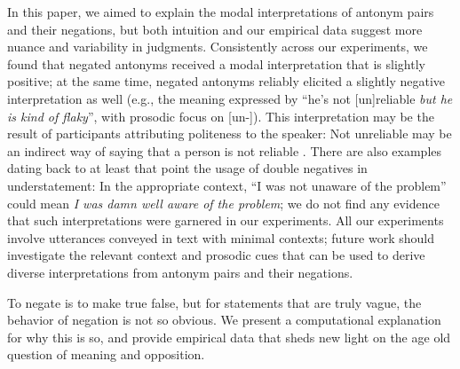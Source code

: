 \documentclass[floatsintext,doc]{apa6}
\begin{document}
In this paper, we aimed to explain the modal interpretations of antonym pairs and their negations, but both intuition and our empirical data suggest more nuance and variability in judgments.
Consistently across our experiments, we found that negated antonyms received a modal interpretation that is slightly positive; at the same time, negated antonyms reliably elicited a slightly negative interpretation as well (e.g., the meaning expressed by ``he's not [un]reliable \emph{but he is kind of flaky}'', with prosodic focus on [un-]).
This interpretation may be the result of participants attributing politeness to the speaker: Not unreliable may be an indirect way of saying that a person is not reliable \cite{Yoon2017}.
There are also examples dating back to at least  that point the usage of double negatives in understatement: In the appropriate context, ``I was not unaware of the problem'' could mean \emph{I was damn well aware of the problem}; we do not find any evidence that such interpretations were garnered in our experiments. 
All our experiments involve utterances conveyed in text with minimal contexts; future work should investigate the relevant context and prosodic cues that can be used to derive diverse interpretations from antonym pairs and their negations.

To negate is to make true false, but for statements that are truly vague, the behavior of negation is not so obvious.
We present a computational explanation for why this is so, and provide empirical data that sheds new light on the age old question of meaning and opposition.





\newpage

\end{document}
